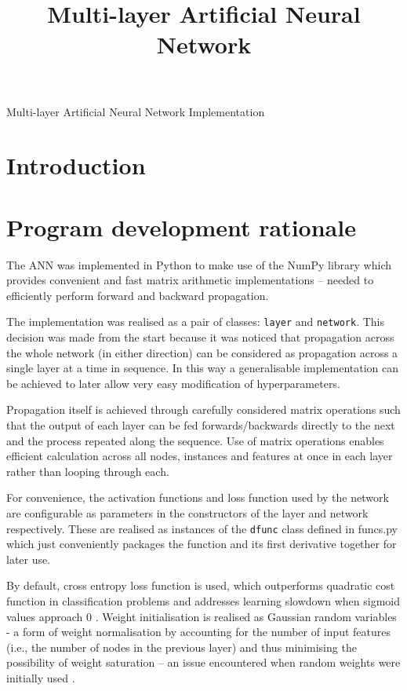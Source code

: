 \documentclass{article}
\begin{document}
\title{Multi-layer Artificial Neural Network}

\begin{center}
  \Large{Multi-layer Artificial Neural Network Implementation}
\end{center}

\section{Introduction}

\section{Program development rationale}

The ANN was implemented in Python to make use of the NumPy library which
provides convenient and fast matrix arithmetic implementations --
needed to efficiently perform forward and backward propagation.

The implementation was realised as a pair of classes: \lstinline{layer}
and \lstinline{network}. This decision was made from the start because
it was noticed that propagation across the whole network (in either
direction) can be considered as propagation across a single layer at a
time in sequence. In this way a generalisable implementation can be
achieved to later allow very easy modification of hyperparameters.

Propagation itself is achieved through carefully considered matrix
operations such that the output of each layer can be fed
forwards/backwards directly to the next and the process repeated along
the sequence. Use of matrix operations enables efficient calculation
across all nodes, instances and features at once in each layer rather
than looping through each.

For convenience, the activation functions and loss function used by the
network are configurable as parameters in the constructors of the layer
and network respectively. These are realised as instances of the
\lstinline{dfunc} class defined in funcs.py which just conveniently
packages the function and its first derivative together for later use.

By default, cross entropy loss function is used, which outperforms
quadratic cost function in classification problems and addresses
learning slowdown when sigmoid values approach 0 \cite{Nielsen}
\cite{Xavier}. Weight initialisation is realised as Gaussian random
variables - a form of weight normalisation by accounting for the number
of input features (i.e., the number of nodes in the previous layer) and
thus minimising the possibility of weight saturation -- an issue
encountered when random weights were initially used \cite{Nielsen}.
\end{document}
